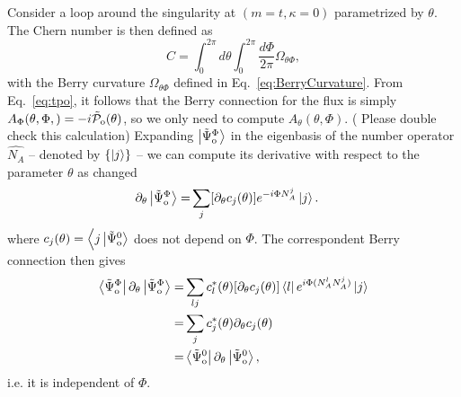 \documentclass[twocolumn,amsmath,longbibliography,amssymb,superscriptaddress]{revtex4-1}
\newcommand{\carlos}[1]{{\color{red} #1}}
\newcommand{\changed}[1]{{\color{orange}#1}}
\newcommand{\tpo}{\tilde{\mathcal{P}}_{\rm o}}
\newcommand{\brapsio}[1]{\bra{\tilde{\Psi}_{{\rm o}}^#1}}
\newcommand{\ketpsio}[1]{\ket{\tilde{\Psi}_{{\rm o}}^#1}}
\begin{document}
Consider a loop around the singularity at $(m=t,\kappa=0)$ parametrized by $\theta$. The Chern number is then defined as
\begin{equation}
C = \int_0^{2\pi}d\theta\int_0^{2\pi}\frac{d\Phi}{2\pi} \Omega_{\theta\Phi},
\label{eq:chern}
\end{equation} 
with the Berry curvature $\Omega_{\theta\Phi}$ defined in Eq.~\ref{eq:BerryCurvature}. 
From  Eq.~\eqref{eq:tpo}, it follows that the Berry connection for the flux is simply $A_\Phi(\theta,\Phi,) = -i\tpo(\theta)$, so we only need to compute $A_\theta(\theta,\Phi)$. (\carlos{Please double check this calculation}) Expanding $\ketpsio{\Phi}$ in the eigenbasis of the number operator $\hat{N_A}$ -- denoted by $\{\ket{j}\}$ -- we can compute its derivative with respect to the parameter $\theta$ as
\changed{changed}
\begin{align}
\partial_\theta \ketpsio{\Phi} =& \sum_j [\partial_\theta c_j (\theta)]e^{-i\Phi N_A^j}\ket{j}.
\end{align}
where $c_j(\theta) = \Big\langle j\ketpsio{0}$ does not depend on $\Phi$. The correspondent Berry connection then gives
\begin{align}
\brapsio{\Phi}\partial_\theta \ketpsio{\Phi} =& \sum_{lj} c^*_l(\theta) [\partial_\theta c_j(\theta)] \bra{l} e^{i\Phi (N_A^lN_A^j)}\ket{j}\nonumber\\
=& \sum_j  c^*_j(\theta) \partial_\theta c_j(\theta) \nonumber\\
=&\brapsio{0}\partial_\theta \ketpsio{0}, 
\end{align}
i.e. it is independent of $\Phi$. 
\end{document}
